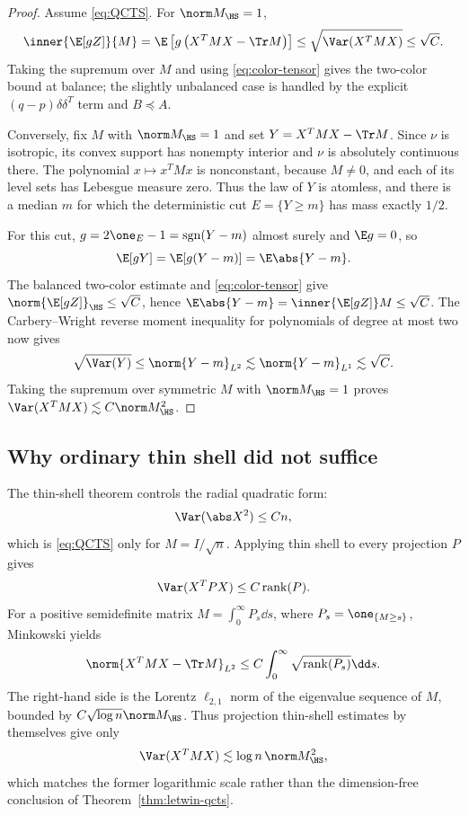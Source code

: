 \documentclass[../../main.tex]{subfiles}
\begin{document}
\begin{proof}
Assume \eqref{eq:QCTS}. For $\norm M_{\HS}=1$,
\[
  \inner{\E[gZ]}{M}
  =\E\left[g\left(X^TMX-\Tr M\right)\right]
  \le \sqrt{\Var(X^TMX)}\le\sqrt C .
\]
Taking the supremum over $M$ and using \eqref{eq:color-tensor} gives the two-color bound at balance;
the slightly unbalanced case is handled by the explicit $(q-p)\delta\delta^T$ term and
$B\preceq A$.

Conversely, fix $M$ with $\norm M_{\HS}=1$ and set
$Y=X^TMX-\Tr M$. Since $\nu$ is isotropic, its convex support has nonempty interior and $\nu$
is absolutely continuous there. The polynomial $x\mapsto x^TMx$ is nonconstant, because
$M\ne0$, and each of its level sets has Lebesgue measure zero. Thus the law of $Y$ is atomless,
and there is a median $m$ for which the deterministic cut $E=\{Y\ge m\}$ has mass exactly
$1/2$.

For this cut, $g=2\one_E-1=\operatorname{sgn}(Y-m)$ almost surely and $\E g=0$, so
\[
  \E[gY]=\E[g(Y-m)]=\E\abs{Y-m}.
\]
The balanced two-color estimate and \eqref{eq:color-tensor} give
$\norm{\E[gZ]}_{\HS}\le\sqrt C$, hence
$\E\abs{Y-m}=\inner{\E[gZ]}M\le\sqrt C$.
The Carbery--Wright reverse moment inequality for polynomials of degree at most two
\cite{CarberyWright2001} now gives
\[
  \sqrt{\Var(Y)}
  \le\norm{Y-m}_{L^2}
  \lesssim\norm{Y-m}_{L^1}
  \lesssim\sqrt C.
\]
Taking the supremum over symmetric $M$ with $\norm M_{\HS}=1$ proves
$\Var(X^TMX)\lesssim C\norm M_{\HS}^2$.
\end{proof}

\subsection{Why ordinary thin shell did not suffice}

The thin-shell theorem controls the radial quadratic form:
\[
  \Var(\abs X^2)\le Cn,
\]
which is \eqref{eq:QCTS} only for $M=I/\sqrt n$. Applying thin shell to every projection $P$ gives
\[
  \Var(X^TPX)\le C\operatorname{rank}(P).
\]
For a positive semidefinite matrix $M=\int_0^\infty P_s\dd s$, where
$P_s=\one_{\{M\ge s\}}$, Minkowski yields
\[
  \norm{X^TMX-\Tr M}_{L^2}
  \le C\int_0^\infty\sqrt{\operatorname{rank}(P_s)}\dd s.
\]
The right-hand side is the Lorentz $\ell_{2,1}$ norm of the eigenvalue sequence of $M$, bounded by
$C\sqrt{\log n}\norm M_{\HS}$. Thus projection thin-shell estimates by themselves give only
\begin{equation}\label{eq:qcts-log}
  \Var(X^TMX)\lesssim \log n\,\norm M_{\HS}^2,
\end{equation}
which matches the former logarithmic scale rather than the dimension-free conclusion of
Theorem~\ref{thm:letwin-qcts}.
\end{document}
